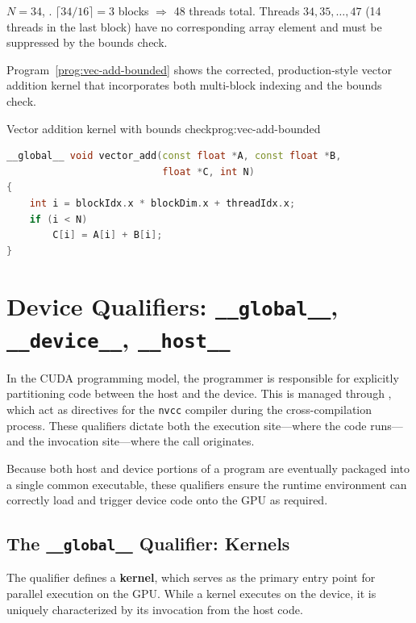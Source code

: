 \begin{ppexample}
$N = 34$, .
$\lceil 34/16 \rceil = 3$ blocks $\Rightarrow$ 48 threads total.
Threads $34, 35, \ldots, 47$ (14 threads in the last block) have no
corresponding array element and must be suppressed by the bounds check.
\end{ppexample}

Program~\ref{prog:vec-add-bounded} shows the corrected, production-style
vector addition kernel that incorporates both multi-block indexing and the
bounds check.

\begin{ppprogram}{Vector addition kernel with bounds check}{prog:vec-add-bounded}
\begin{lstlisting}[language=C++]
__global__ void vector_add(const float *A, const float *B,
                           float *C, int N)
{
    int i = blockIdx.x * blockDim.x + threadIdx.x;
    if (i < N)
        C[i] = A[i] + B[i];
}
\end{lstlisting}
\end{ppprogram}


\section{Device Qualifiers: \texttt{\_\_global\_\_}, \texttt{\_\_device\_\_}, \texttt{\_\_host\_\_}}
\label{sec:device-qualifiers}

In the CUDA programming model, the programmer is responsible for explicitly partitioning code between the host and the device. This is managed through , which act as directives for the \texttt{nvcc} compiler during the cross-compilation process. These qualifiers dictate both the execution site—where the code runs—and the invocation site—where the call originates. 

Because both host and device portions of a program are eventually packaged into a single common executable, these qualifiers ensure the runtime environment can correctly load and trigger device code onto the GPU as required.

\subsection{The \texttt{\_\_global\_\_} Qualifier: Kernels}

The  qualifier defines a \textbf{kernel}, which serves as the primary entry point for parallel execution on the GPU. While a kernel executes on the device, it is uniquely characterized by its invocation from the host code.

